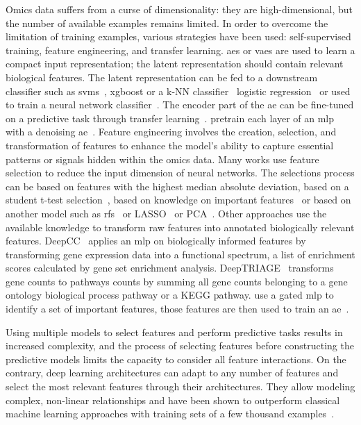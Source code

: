 \documentclass[../main.tex]{subfiles}
\begin{document}
	Omics data suffers from a curse of dimensionality: they are high-dimensional, but the number of available examples remains limited.
	In order to overcome the limitation of training examples, various strategies have been used: self-supervised training, feature engineering, and transfer learning.
	\Glspl{ae} or \glspl{vae} are used to learn a compact input representation; the latent representation should contain relevant biological features.
	The latent representation can be fed to a downstream classifier such as \glspl{svm}~\cite{Zhang2020}, \gls{xgboost} or a k-NN classifier~\cite{Arafa2023} logistic regression~\cite{Wang2018} or used to train a neural network classifier~\cite{Karim2019}.
	The encoder part of the \gls{ae} can be fine-tuned on a predictive task through transfer learning~\cite{Levy2020,Kaczmarek2022}.
	\citeauthor{Hanczar2018} pretrain each layer of an \gls{mlp} with a denoising \gls{ae}~\cite{Hanczar2018}.
	Feature engineering involves the creation, selection, and transformation of features to enhance the model's ability to capture essential patterns or signals hidden within the omics data.
	Many works use feature selection to reduce the input dimension of neural networks.
	The selections process can be based on features with the highest median absolute deviation, based on a student t-test selection~\cite{Liu2019}, based on knowledge on important features~\cite{Kaczmarek2022} or based on another model such as \glspl{rf}~\cite{Wojewodzic2021,Liu2019} or LASSO~\cite{Liu2019} or PCA~\cite{Yu2019}.
	Other approaches use the available knowledge to transform raw features into annotated biologically relevant features.
	DeepCC~\cite{gaoDeepCCNovelDeep2019} applies an \gls{mlp} on biologically informed features by transforming gene expression data into a functional spectrum, \ie{}a list of enrichment scores calculated by gene set enrichment analysis.
	DeepTRIAGE~\cite{beykikhoshkDeepTRIAGEInterpretableIndividualised2020a} transforms gene counts to pathways counts by summing all gene counts belonging to a gene ontology biological process pathway or a KEGG pathway.
	\citeauthor{Zhang2020} use a gated \gls{mlp} to identify a set of important features, those features are then used to train an \gls{ae}~\cite{Zhang2020}.

	Using multiple models to select features and perform predictive tasks results in increased complexity, and the process of selecting features before constructing the predictive models limits the capacity to consider all feature interactions.
	On the contrary, deep learning architectures can adapt to any number of features and select the most relevant features through their architectures.
	They allow modeling complex, non-linear relationships and have been shown to outperform classical machine learning approaches with training sets of a few thousand examples~\cite{Hanczar2022}.
\end{document}
